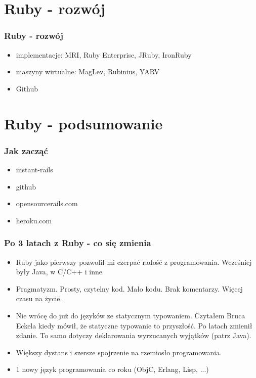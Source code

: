 \documentclass[12t]{beamer}
\begin{document}
\section{Ruby - rozwój}
\begin{frame}
  \frametitle{Ruby - rozwój}
  \begin{itemize}
  \item implementacje: MRI, Ruby Enterprise, JRuby, IronRuby
  \item maszyny wirtualne: MagLev, Rubinius, YARV
  \item Github
  \end{itemize}
\end{frame}

\section{Ruby - podsumowanie}
\begin{frame}
  \frametitle{Jak zacząć}
  \begin{itemize}
  \item instant-rails
  \item github
  \item opensourcerails.com
  \item heroku.com
  \end{itemize}
\end{frame}

\begin{frame}
  \frametitle{Po 3 latach z Ruby - co się zmienia}
  \begin{itemize}
  \item Ruby jako pierwszy pozwolił mi czerpać radość z
    programowania. Wcześniej były Java, w C/C++ i inne
  \item Pragmatyzm. Prosty, czytelny kod. Mało kodu. Brak
    komentarzy. Więcej czasu na życie.
  \item Nie wrócę do już do języków ze statycznym typowaniem. Czytałem
    Bruca Eckela kiedy mówił, że statyczne typowanie to przyszłość. Po
    latach zmienił zdanie. To samo dotyczy deklarowania wyrzucanych
    wyjątków (patrz Java).
  \item Większy dystans i szersze spojrzenie na rzemiosło programowania.
  \item 1 nowy język programowania co roku (ObjC, Erlang, Lisp, ...)
  \end{itemize}
\end{frame}
\end{document}
